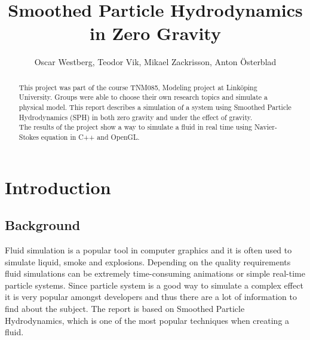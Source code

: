 \documentclass[a4paper,12pt,twoside]{report}
\begin{document}
\pagestyle{plain}


\title{Smoothed Particle Hydrodynamics in Zero Gravity}
\author{Oscar Westberg, Teodor Vik, Mikael Zackrisson, Anton Österblad}
\maketitle

\thispagestyle{empty}
\newpage{}

\setcounter{page}{2}
\begin{abstract}
This project was part of the course TNM085, Modeling project at Linköping University. Groups were able to choose their own research topics and simulate a physical model. This report describes a simulation of a system using Smoothed Particle Hydrodynamics (SPH) in both zero gravity and under the effect of gravity. \\

\noindent The results of the project show a way to simulate a fluid in real time using Navier-Stokes equation in C++ and OpenGL.
\vfill
\end{abstract}
\newpage{}

\tableofcontents  %
\listoffigures    %



\chapter{Introduction}


\section{Background}
Fluid simulation is a popular tool in computer graphics and it is often used to simulate liquid, smoke and explosions. Depending on the quality requirements fluid simulations can be extremely time-consuming animations or simple real-time particle systems. Since particle system is a good way to simulate a complex effect it is very popular amongst developers and thus there are a lot of information to find about the subject. The report is based on Smoothed Particle Hydrodynamics, which is one of the most popular techniques when creating a fluid.
\end{document}
